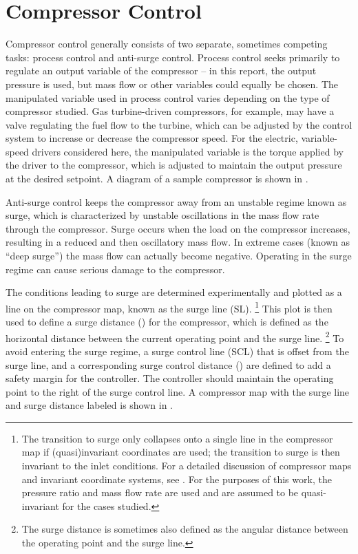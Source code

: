 \section{Compressor Control}
\label{sec:intro:compressor}

Compressor control generally consists of two separate, sometimes competing tasks: process control and anti-surge control.
Process control seeks primarily to regulate an output variable of the compressor -- in this report, the output pressure is used, but mass flow or other variables could equally be chosen.
The manipulated variable used in process control varies depending on the type of compressor studied.
Gas turbine-driven compressors, for example, may have a valve regulating the fuel flow to the turbine, which can be adjusted by the control system to increase or decrease the compressor speed. 
For the electric, variable-speed drivers considered here, the manipulated variable is the torque applied by the driver to the compressor, which is adjusted to maintain the output pressure at the desired setpoint.
A diagram of a sample compressor is shown in .

Anti-surge control keeps the compressor away from an unstable regime known as surge, which is characterized by unstable oscillations in the mass flow rate through the compressor.
Surge occurs when the load on the compressor increases, resulting in a reduced and then oscillatory mass flow.
In extreme cases (known as ``deep surge'') the mass flow can actually become negative.
Operating in the surge regime can cause serious damage to the compressor.

The conditions leading to surge are determined experimentally and plotted as a line on the compressor map, known as the surge line (SL).
\footnote{The transition to surge only collapses onto a single line in the compressor map if (quasi)invariant coordinates are used; the transition to surge is then invariant to the inlet conditions. 
For a detailed discussion of compressor maps and invariant coordinate systems, see \cite{Batson1996}.
For the purposes of this work, the pressure ratio and mass flow rate are used and are assumed to be quasi-invariant for the cases studied.}
This plot is then used to define a surge distance () for the compressor, which is defined as the horizontal distance between the current operating point and the surge line.
\footnote{The surge distance is sometimes also defined as the angular distance between the operating point and the surge line.}
To avoid entering the surge regime, a surge control line (SCL) that is offset from the surge line, and a corresponding surge control distance () are defined to add a safety margin for the controller.
The controller should maintain the operating point to the right of the surge control line.
A compressor map with the surge line and surge distance labeled is shown in .

